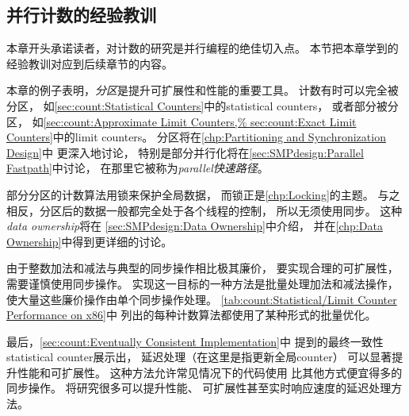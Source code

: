 \subsection{并行计数的经验教训}
\label{sec:count:Parallel Counting Lessons}

本章开头承诺读者，对计数的研究是并行编程的绝佳切入点。
本节把本章学到的经验教训对应到后续章节的内容。

本章的例子表明，\emph{分区}是提升可扩展性和性能的重要工具。
计数有时可以完全被分区，
如\cref{sec:count:Statistical Counters}中的statistical counters，
或者部分被分区，
如\cref{sec:count:Approximate Limit Counters,%
sec:count:Exact Limit Counters}中的limit counters。
分区将在\cref{chp:Partitioning and Synchronization Design}中
更深入地讨论，
特别是部分并行化将在\cref{sec:SMPdesign:Parallel Fastpath}中讨论，
在那里它被称为\emph{parallel快速路径}。

\QuickQuizEnd

部分分区的计数算法用锁来保护全局数据，
而锁正是\cref{chp:Locking}的主题。
与之相反，分区后的数据一般都完全处于各个线程的控制，
所以无须使用同步。
这种\emph{data ownership}将在
\cref{sec:SMPdesign:Data Ownership}中介绍，
并在\cref{chp:Data Ownership}中得到更详细的讨论。

由于整数加法和减法与典型的同步操作相比极其廉价，
要实现合理的可扩展性，需要谨慎使用同步操作。
实现这一目标的一种方法是批量处理加法和减法操作，
使大量这些廉价操作由单个同步操作处理。
\cref{tab:count:Statistical/Limit Counter Performance on x86}中
列出的每种计数算法都使用了某种形式的批量优化。

最后，\cref{sec:count:Eventually Consistent Implementation}中
提到的最终一致性statistical counter展示出，
延迟处理（在这里是指更新全局counter）
可以显著提升性能和可扩展性。
这种方法允许常见情况下的代码使用
比其他方式便宜得多的同步操作。
将研究很多可以提升性能、
可扩展性甚至实时响应速度的延迟处理方法。

